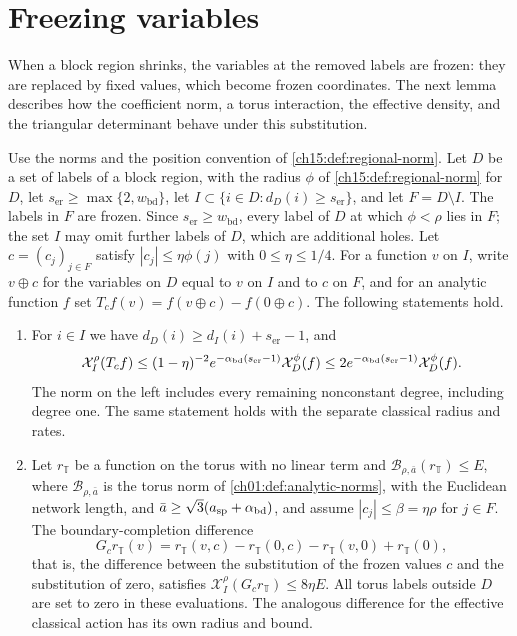\section{Freezing variables}\label{ch15:sec:freezing}

When a block region shrinks, the variables at the removed labels are frozen: they are replaced by fixed values, which become frozen coordinates. The next lemma describes how the coefficient norm, a torus interaction, the effective density, and the triangular determinant behave under this substitution.

\begin{lemma}\label{ch15:lem:freezing}
Use the norms and the position convention of \cref{ch15:def:regional-norm}. Let $D$ be a set of labels of a block region, with the radius $\phi$ of \cref{ch15:def:regional-norm} for $D$, let $s_{\mathrm{er}}\ge\max\{2,w_{\mathrm{bd}}\}$, let $I\subset\{i\in D:d_D(i)\ge s_{\mathrm{er}}\}$, and let $F=D\setminus I$. The labels in $F$ are frozen. Since $s_{\mathrm{er}}\ge w_{\mathrm{bd}}$, every label of $D$ at which $\phi<\rho$ lies in $F$; the set $I$ may omit further labels of $D$, which are additional holes. Let $c=(c_j)_{j\in F}$ satisfy $|c_j|\le\eta\phi(j)$ with $0\le\eta\le1/4$. For a function $v$ on $I$, write $v\oplus c$ for the variables on $D$ equal to $v$ on $I$ and to $c$ on $F$, and for an analytic function $f$ set $T_cf(v)=f(v\oplus c)-f(0\oplus c)$. The following statements hold.
\begin{enumerate}
\item For $i\in I$ we have $d_D(i)\ge d_I(i)+s_{\mathrm{er}}-1$, and
\[
 \mathcal X_I^\rho(T_cf)
 \le(1-\eta)^{-2}e^{-\alpha_{\mathrm{bd}}(s_{\mathrm{er}}-1)}
                                      \mathcal X_D^\phi(f)
 \le2e^{-\alpha_{\mathrm{bd}}(s_{\mathrm{er}}-1)}\mathcal X_D^\phi(f).
\]
The norm on the left includes every remaining nonconstant degree, including degree one. The same statement holds with the separate classical radius and rates.
\item Let $r_{\mathbb T}$ be a function on the torus with no linear term and $\mathcal B_{\rho,\bar a}(r_{\mathbb T})\le E$, where $\mathcal B_{\rho,\bar a}$ is the torus norm of \cref{ch01:def:analytic-norms}, with the Euclidean network length, and $\bar a\ge\sqrt3(a_{\mathrm{sp}}+\alpha_{\mathrm{bd}})$, and assume $|c_j|\le\beta=\eta\rho$ for $j\in F$. The boundary-completion difference
\[
 G_cr_{\mathbb T}(v)=r_{\mathbb T}(v,c)-r_{\mathbb T}(0,c)
                        -r_{\mathbb T}(v,0)+r_{\mathbb T}(0),
\]
that is, the difference between the substitution of the frozen values $c$ and the substitution of zero, satisfies $\mathcal X_I^\rho(G_cr_{\mathbb T})\le8\eta E$. All torus labels outside $D$ are set to zero in these evaluations. The analogous difference for the effective classical action has its own radius and bound.

\end{enumerate}
\end{lemma}
